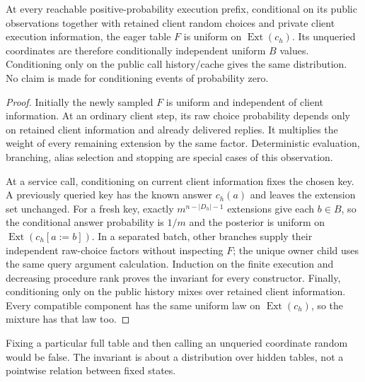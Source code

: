 \begin{lemma}
At every reachable positive-probability execution prefix, conditional on
its public observations together with retained client random choices
and private client execution information, the eager table $F$ is uniform
on $\operatorname{Ext}(c_h)$. Its unqueried coordinates are therefore
conditionally independent uniform $B$ values. Conditioning only on the
public call history/cache gives the same distribution. No claim is made
for conditioning events of probability zero.
\end{lemma}
\begin{proof}
Initially the newly sampled $F$ is uniform and independent of client
information. At an ordinary client step, its raw choice probability
depends only on retained client information and already delivered replies.
It multiplies the weight of every remaining extension by the same factor.
Deterministic evaluation, branching, alias selection and stopping are
special cases of this observation.

At a service call, conditioning on current client information fixes the
chosen key. A previously queried key has the known answer $c_h(a)$ and
leaves the extension set unchanged. For a fresh key, exactly
$m^{n-|D_h|-1}$ extensions give each $b\in B$, so the conditional answer
probability is $1/m$ and the posterior is uniform on
$\operatorname{Ext}(c_h[a:=b])$. In a separated batch, other branches
supply their independent raw-choice factors without inspecting $F$;
the unique owner child uses the same query argument calculation.
Induction on the finite execution and decreasing procedure rank proves
the invariant for every constructor. Finally, conditioning only on the
public history mixes over retained client information. Every compatible
component has the same uniform law on $\operatorname{Ext}(c_h)$, so
the mixture has that law too.
\end{proof}
Fixing a particular full table and then calling an unqueried coordinate
random would be false. The invariant is about a distribution over hidden
tables, not a pointwise relation between fixed states.


